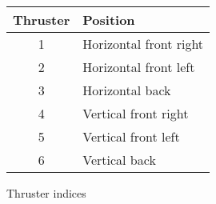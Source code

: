 \begin{figure}
	\begin{center}
		\begin{tabular}{c l}
			Thruster & Position \\
			\hline		
			1 & Horizontal front right \\
			2 & Horizontal front left \\
			3 & Horizontal back \\
			4 & Vertical front right \\
			5 & Vertical front left \\
			6 & Vertical back
		\end{tabular}
	\caption{Thruster indices}
	\label{fig:THRUSTERINDICES}
	 \end{center}
 \end{figure}
		 